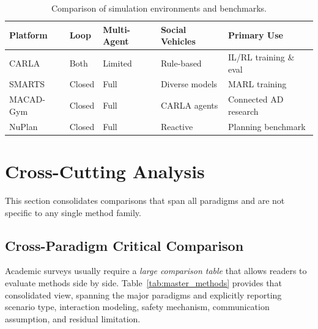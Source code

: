 \documentclass[12pt, a4paper]{article}
\begin{document}
\begin{table}[htbp]
\centering
\caption{Comparison of simulation environments and benchmarks.}
\label{tab:simulators}
\begin{tabular}{lllll}
\toprule
\textbf{Platform} & \textbf{Loop} & \textbf{Multi-Agent} &
\textbf{Social Vehicles} & \textbf{Primary Use} \\
\midrule
CARLA \citep{dosovitskiy2017carlaopenurbandriving} & Both & Limited & Rule-based &
IL/RL training \& eval \\
SMARTS \citep{zhou2020smarts} & Closed & Full & Diverse models &
MARL training \\
MACAD-Gym \citep{palanisamy2020multi} & Closed & Full & CARLA agents &
Connected AD research \\
NuPlan \citep{caesar2021nuplan} & Closed & Full & Reactive &
Planning benchmark \\
\bottomrule
\end{tabular}
\end{table}

\section{Cross-Cutting Analysis}
\label{sec:crosscut}

This section consolidates comparisons that span all paradigms and are not
specific to any single method family.

\subsection{Cross-Paradigm Critical Comparison}

Academic surveys usually require a \emph{large comparison table} that allows
readers to evaluate methods side by side. Table~\ref{tab:master_methods}
provides that consolidated view, spanning the major paradigms and explicitly
reporting scenario type, interaction modeling, safety mechanism, communication
assumption, and residual limitation.
\end{document}
